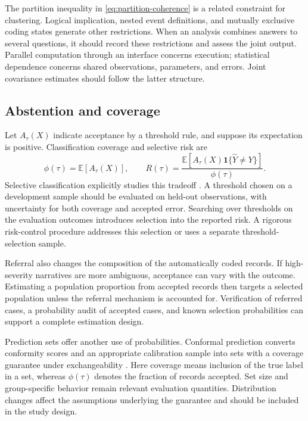 \documentclass[11pt,a4paper]{article}
\newcommand{\E}{\mathbb{E}}
\newcommand{\ind}{\mathbf{1}}
\begin{document}
The partition inequality in \eqref{eq:partition-coherence} is a related constraint for clustering. Logical implication, nested event definitions, and mutually exclusive coding states generate other restrictions. When an analysis combines answers to several questions, it should record these restrictions and assess the joint output. Parallel computation through an interface concerns execution; statistical dependence concerns shared observations, parameters, and errors. Joint covariance estimates should follow the latter structure.

\subsection{Abstention and coverage}

Let $A_\tau(X)$ indicate acceptance by a threshold rule, and suppose its expectation is positive. Classification coverage and selective risk are
\begin{equation}
 \phi(\tau)=\E[A_\tau(X)],\qquad
 R(\tau)=\frac{\E[A_\tau(X)\ind\{\widehat Y\ne Y\}]}{\phi(\tau)}.
 \label{eq:selective}
\end{equation}
Selective classification explicitly studies this tradeoff \citep{geifman2017}. A threshold chosen on a development sample should be evaluated on held-out observations, with uncertainty for both coverage and accepted error. Searching over thresholds on the evaluation outcomes introduces selection into the reported risk. A rigorous risk-control procedure addresses this selection or uses a separate threshold-selection sample.

Referral also changes the composition of the automatically coded records. If high-severity narratives are more ambiguous, acceptance can vary with the outcome. Estimating a population proportion from accepted records then targets a selected population unless the referral mechanism is accounted for. Verification of referred cases, a probability audit of accepted cases, and known selection probabilities can support a complete estimation design.

Prediction sets offer another use of probabilities. Conformal prediction converts conformity scores and an appropriate calibration sample into sets with a coverage guarantee under exchangeability \citep{shafer2008}. Here coverage means inclusion of the true label in a set, whereas $\phi(\tau)$ denotes the fraction of records accepted. Set size and group-specific behavior remain relevant evaluation quantities. Distribution changes affect the assumptions underlying the guarantee and should be included in the study design.
\end{document}
